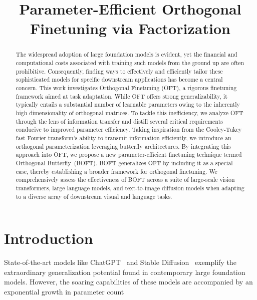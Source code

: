 \title{Parameter-Efficient Orthogonal Finetuning via Factorization}

\begin{abstract}
The widespread adoption of large foundation models is evident, yet the financial and computational costs associated with training such models from the ground up are often prohibitive. Consequently, finding ways to effectively and efficiently tailor these sophisticated models for specific downstream applications has become a central concern. This work investigates Orthogonal Finetuning (OFT), a rigorous finetuning framework aimed at task adaptation. While OFT offers strong generalizability, it typically entails a substantial number of learnable parameters owing to the inherently high dimensionality of orthogonal matrices. To tackle this inefficiency, we analyze OFT through the lens of information transfer and distill several critical requirements conducive to improved parameter efficiency. Taking inspiration from the Cooley-Tukey fast Fourier transform’s ability to transmit information efficiently, we introduce an orthogonal parameterization leveraging butterfly architectures. By integrating this approach into OFT, we propose a new parameter-efficient finetuning technique termed Orthogonal Butterfly~(BOFT). BOFT generalizes OFT by including it as a special case, thereby establishing a broader framework for orthogonal finetuning. We comprehensively assess the effectiveness of BOFT across a suite of large-scale vision transformers, large language models, and text-to-image diffusion models when adapting to a diverse array of downstream visual and language tasks.
\end{abstract}

\section{Introduction}

State-of-the-art models like ChatGPT~\cite{brown2020language,chen2021evaluating} and Stable Diffusion~\cite{rombach2022high} exemplify the extraordinary generalization potential found in contemporary large foundation models. However, the soaring capabilities of these models are accompanied by an exponential growth in parameter count

